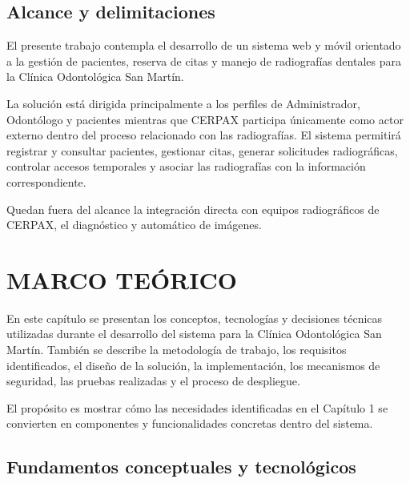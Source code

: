 	\section{Alcance y delimitaciones}
	
	El presente trabajo contempla el desarrollo de un sistema web y móvil
	orientado a la gestión de pacientes, reserva de citas y manejo de
	radiografías dentales para la Clínica Odontológica San Martín.
	
	La solución está dirigida principalmente a los perfiles de Administrador,
	Odontólogo y pacientes mientras que CERPAX participa únicamente como actor externo
	dentro del proceso relacionado con las radiografías. El sistema permitirá
	registrar y consultar pacientes, gestionar citas, generar solicitudes
	radiográficas, controlar accesos temporales y asociar las radiografías con
	la información correspondiente.
	
	Quedan fuera del alcance la integración directa con equipos radiográficos
	de CERPAX, el diagnóstico y automático de imágenes. %
	

\chapter{MARCO TEÓRICO}

En este capítulo se presentan los conceptos, tecnologías y decisiones
técnicas utilizadas durante el desarrollo del sistema para la Clínica
Odontológica San Martín. También se describe la metodología de trabajo,
los requisitos identificados, el diseño de la solución, la implementación,
los mecanismos de seguridad, las pruebas realizadas y el proceso de
despliegue.

El propósito es mostrar cómo las necesidades identificadas en el Capítulo 1
se convierten en componentes y funcionalidades concretas dentro del sistema.



\section{Fundamentos conceptuales y tecnológicos}


